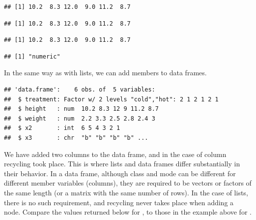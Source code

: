 \documentclass[krantz2]{krantz}\usepackage{knitr}
\begin{document}
\begin{knitrout}\footnotesize
{}\color{fgcolor}\begin{kframe}
\begin{alltt}
\hlopt{$}
\end{alltt}
\begin{verbatim}
## [1] 10.2  8.3 12.0  9.0 11.2  8.7
\end{verbatim}
\begin{alltt}
\hlstd{a.df[[}\hlstd{]]}
\end{alltt}
\begin{verbatim}
## [1] 10.2  8.3 12.0  9.0 11.2  8.7
\end{verbatim}
\begin{alltt}
\hlstd{a.df[[}\hlstd{]]}
\end{alltt}
\begin{verbatim}
## [1] 10.2  8.3 12.0  9.0 11.2  8.7
\end{verbatim}
\begin{alltt}
\hlstd{(a.df[[}\hlstd{]])}
\end{alltt}
\begin{verbatim}
## [1] "numeric"
\end{verbatim}
\end{kframe}
\end{knitrout}

In the same way as with lists, we can add members to data frames.

\begin{knitrout}\footnotesize
{}\color{fgcolor}\begin{kframe}
\begin{alltt}
\hlopt{$} \hlkwb{<-} \hlopt{:}
\hlstd{a.df[[}\hlstd{]]} \hlkwb{<-} 
\end{alltt}
\begin{verbatim}
## 'data.frame':	6 obs. of  5 variables:
##  $ treatment: Factor w/ 2 levels "cold","hot": 2 1 2 1 2 1
##  $ height   : num  10.2 8.3 12 9 11.2 8.7
##  $ weight   : num  2.2 3.3 2.5 2.8 2.4 3
##  $ x2       : int  6 5 4 3 2 1
##  $ x3       : chr  "b" "b" "b" "b" ...
\end{verbatim}
\end{kframe}
\end{knitrout}

We have added two columns to the data frame, and in the case of column  recycling took place. This is where lists and data frames differ substantially in their behavior. In a data frame, although class and mode can be different for different member variables (columns), they are required to be vectors or factors of the same length (or a matrix with the same number of rows). In the case of lists, there is no such requirement, and recycling never takes place when adding a node. Compare the values returned below for , to those in the example above for .
\end{document}

